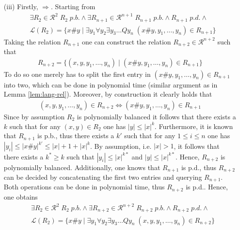 \documentclass [11pt]{article}
\begin{document}
\begin{enumerate}
\item[(iii)] Firstly, $\Rightarrow$. Starting from 
 \begin{equation*}
\begin{split}
&\exists R_2 \in \mathcal{R}^{2} \; R_2 \; p.b.  \land  \exists R_{n+1}  \in  \mathcal{R}^{n+1} \; R_{n+1} \; p.b. \land R_{n+1} \; p.d. \land  \\
&\mathcal{L}(R_2) = \{x\#y \mid \exists y_1 \forall y_2\exists y_3\dots Q y_n  \; (x\#y,y_1,\ldots,y_n) \in R_{n+1}\} 
\end{split}
\end{equation*}
Taking the relation $R_{n+1}$ one can construct the relation $R_{n+2} \in \mathcal{R}^{n+2}$ such that 
 \begin{equation*}
\begin{split}
 R_{n+2}=\{ (x,y,y_1,\ldots,y_n) \mid (x\#y,y_1,\ldots,y_n) \in R_{n+1}\} 
\end{split}
\end{equation*}
To do so one merely has to split the first entry in $(x\#y,y_1,\ldots,y_n) \in R_{n+1}$ into two, which can be done in polynomial time (similar argument as in Lemma \ref{lem:lang-rel}). Moreover, by construction it clearly holds that
 \begin{equation*}
\begin{split}
 (x,y,y_1,\ldots,y_n) \in R_{n+2} \iff  (x\#y,y_1,\ldots,y_n) \in R_{n+1}
\end{split}
\end{equation*}
Since by assumption $R_2$ is polynomially balanced it follows that there exists a $k$ such that for any $(x,y) \in R_{2}$ one has $|y| \leq |x|^k$. Furthermore, it is known that $R_{n+1}$ is p.b., thus there exists a $k'$ such that for any $1 \leq i \leq n$ one has $|y_i| \leq |x\#y|^{k'}\leq |x| +1 +|x|^k$. By assumption, i.e. $|x|>1$, it follows that there exists a $k^* \geq k$ such that $|y_i| \leq |x|^{k*}$ and $|y| \leq |x|^{k*}$. Hence, $R_{n+2}$ is polynomially balanced. 
Additionally, one knows that $R_{n+1}$ is p.d., thus $R_{n+2}$ can be decided by concatenating the first two entries and querying $R_{n+1}$. Both operations can be done in polynomial time, thus $R_{n+2}$ is p.d..
Hence, one obtains 
 \begin{equation*}
\begin{split}
&\exists R_2 \in \mathcal{R}^{2} \; R_2 \; p.b.  \land  \exists R_{n+2}  \in  \mathcal{R}^{n+2} \; R_{n+2} \; p.b. \land R_{n+2} \; p.d. \land  \\
&\mathcal{L}(R_2) = \{x\#y \mid \exists y_1 \forall y_2\exists y_3\dots Q y_n  \; (x,y,y_1,\ldots,y_n) \in R_{n+2}\} 
\end{split}
\end{equation*}


\end{enumerate}
\end{document}
